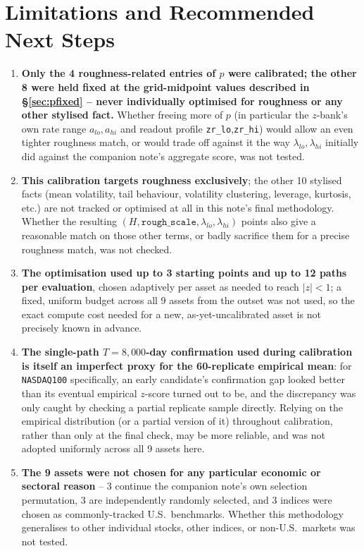 \documentclass[11pt]{article}
\begin{document}
\section{Limitations and Recommended Next Steps}
\label{sec:limitations}
\begin{enumerate}
\item \textbf{Only the 4 roughness-related entries of $p$ were calibrated; the
other 8 were held fixed at the grid-midpoint values described in
\S\ref{sec:pfixed} -- never individually optimised for roughness or any other
stylised fact.} Whether freeing more of $p$ (in particular the $z$-bank's own
rate range $a_{lo},a_{hi}$ and readout profile \texttt{zr\_lo},\texttt{zr\_hi})
would allow an even tighter roughness match, or would trade off against it the
way $\lambda_{lo},\lambda_{hi}$ initially did against the companion note's
aggregate score, was not tested.
\item \textbf{This calibration targets roughness exclusively}; the other 10
stylised facts (mean volatility, tail behaviour, volatility clustering, leverage,
kurtosis, etc.) are not tracked or optimised at all in this note's final
methodology. Whether the resulting $(H,\texttt{rough\_scale},\lambda_{lo},
\lambda_{hi})$ points also give a reasonable match on those other terms, or badly
sacrifice them for a precise roughness match, was not checked.
\item \textbf{The optimisation used up to 3 starting points and up to 12 paths per
evaluation}, chosen adaptively per asset as needed to reach $|z|<1$; a fixed,
uniform budget across all 9 assets from the outset was not used, so the exact
compute cost needed for a new, as-yet-uncalibrated asset is not precisely known in
advance.
\item \textbf{The single-path $T=8{,}000$-day confirmation used during calibration
is itself an imperfect proxy for the 60-replicate empirical mean}: for
\texttt{NASDAQ100} specifically, an early candidate's confirmation gap looked
better than its eventual empirical $z$-score turned out to be, and the discrepancy
was only caught by checking a partial replicate sample directly. Relying on the
empirical distribution (or a partial version of it) throughout calibration, rather
than only at the final check, may be more reliable, and was not adopted uniformly
across all 9 assets here.
\item \textbf{The 9 assets were not chosen for any particular economic or
sectoral reason} -- 3 continue the companion note's own selection permutation, 3
are independently randomly selected, and 3 indices were chosen as commonly-tracked
U.S.\ benchmarks. Whether this methodology generalises to other individual stocks,
other indices, or non-U.S.\ markets was not tested.
\end{enumerate}
\end{document}
